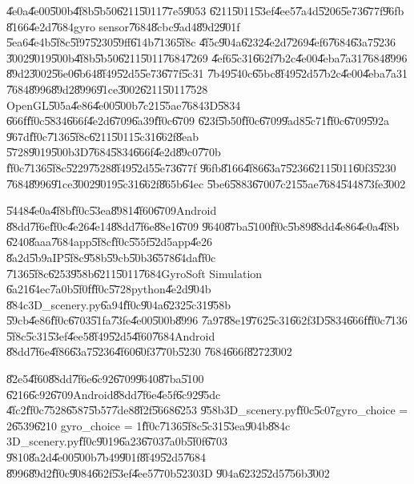 \U{4e0a}\U{4e00}\U{500b}\U{4f8b}\U{5b50}\U{6211}\U{5011}\U{77e5}\U{9053}%
\U{6211}\U{5011}\U{53ef}\U{4ee5}\U{7a4d}\U{5206}\U{5e73}\U{677f}\U{96fb}%
\U{8166}\U{4e2d}\U{7684}gyro sensor\U{7684}\U{8cbc}\U{9ad4}\U{89d2}\U{901f}%
\U{5ea6}\U{4e4b}\U{5f8c}\U{5f97}\U{5230}\U{59ff}\U{614b}\U{7136}\U{5f8c}%
\U{4f5c}\U{904a}\U{6232}\U{4e2d}\U{7269}\U{4ef6}\U{7684}\U{63a7}\U{5236}%
\U{3002}\U{9019}\U{500b}\U{4f8b}\U{5b50}\U{6211}\U{5011}\U{7684}\U{7269}%
\U{4ef6}\U{5c31}\U{662f}\U{7b2c}\U{4e00}\U{4eba}\U{7a31}\U{7684}\U{8996}%
\U{89d2}\U{3002}\U{56e0}\U{6b64}\U{8f49}\U{52d5}\U{5e73}\U{677f}\U{5c31}%
\U{7b49}\U{540c}\U{65bc}\U{8f49}\U{52d5}\U{7b2c}\U{4e00}\U{4eba}\U{7a31}%
\U{7684}\U{8996}\U{89d2}\U{8996}\U{91ce}\U{3002}\U{6211}\U{5011}\U{7528}%
OpenGL\U{505a}\U{4e86}\U{4e00}\U{500b}\U{7c21}\U{55ae}\U{7684}3D\U{5834}%
\U{666f}\U{ff0c}\U{5834}\U{666f}\U{4e2d}\U{6709}\U{6a39}\U{ff0c}\U{6709}%
\U{623f}\U{5b50}\U{ff0c}\U{6709}\U{9ad8}\U{5c71}\U{ff0c}\U{6709}\U{592a}%
\U{967d}\U{ff0c}\U{7136}\U{5f8c}\U{6211}\U{5011}\U{5c31}\U{662f}\U{8eab}%
\U{5728}\U{9019}\U{500b}3D\U{7684}\U{5834}\U{666f}\U{4e2d}\U{89c0}\U{770b}%
\U{ff0c}\U{7136}\U{5f8c}\U{5229}\U{7528}\U{8f49}\U{52d5}\U{5e73}\U{677f}%
\U{96fb}\U{8166}\U{4f86}\U{63a7}\U{5236}\U{6211}\U{5011}\U{60f3}\U{5230}%
\U{7684}\U{8996}\U{91ce}\U{3002}\U{9019}\U{5c31}\U{662f}\U{865b}\U{64ec}%
\U{5be6}\U{5883}\U{6700}\U{7c21}\U{55ae}\U{7684}\U{5448}\U{73fe}\U{3002}

\bigskip

\U{5448}\U{4e0a}\U{4f8b}\U{ff0c}\U{53ea}\U{8981}\U{4f60}\U{6709}Android%
\U{88dd}\U{7f6e}\U{ff0c}\U{4e26}\U{4e14}\U{88dd}\U{7f6e}\U{88e1}\U{6709}%
\U{9640}\U{87ba}\U{5100}\U{ff0c}\U{5b89}\U{88dd}\U{4e86}\U{4e0a}\U{4f8b}%
\U{6240}\U{8aaa}\U{7684}app\U{5f8c}\U{ff0c}\U{555f}\U{52d5}app\U{4e26}%
\U{8a2d}\U{5b9a}IP\U{5f8c}\U{958b}\U{59cb}\U{50b3}\U{6578}\U{64da}\U{ff0c}%
\U{7136}\U{5f8c}\U{6253}\U{958b}\U{6211}\U{5011}\U{7684}GyroSoft Simulation%
\U{6a21}\U{64ec}\U{7a0b}\U{5f0f}\U{ff0c}\U{5728}python\U{4e2d}\U{904b}%
\U{884c}3D\_scenery.py\U{6a94}\U{ff0c}\U{904a}\U{6232}\U{5c31}\U{958b}%
\U{59cb}\U{4e86}\U{ff0c}\U{6703}\U{51fa}\U{73fe}\U{4e00}\U{500b}\U{8996}%
\U{7a97}\U{88e1}\U{9762}\U{5c31}\U{662f}3D\U{5834}\U{666f}\U{ff0c}\U{7136}%
\U{5f8c}\U{5c31}\U{53ef}\U{4ee5}\U{8f49}\U{52d5}\U{4f60}\U{7684}Android%
\U{88dd}\U{7f6e}\U{4f86}\U{63a7}\U{5236}\U{4f60}\U{60f3}\U{770b}\U{5230}%
\U{7684}\U{666f}\U{8272}\U{3002}

\bigskip

\U{82e5}\U{4f60}\U{88dd}\U{7f6e}\U{6c92}\U{6709}\U{9640}\U{87ba}\U{5100}%
\U{6216}\U{6c92}\U{6709}Android\U{88dd}\U{7f6e}\U{4e5f}\U{6c92}\U{95dc}%
\U{4fc2}\U{ff0c}\U{7528}\U{6587}\U{5b57}\U{7de8}\U{8f2f}\U{5668}\U{6253}%
\U{958b}3D\_scenery.py\U{ff0c}\U{5c07}gyro\_choice = 2\U{6539}\U{6210}%
gyro\_choice = 1\U{ff0c}\U{7136}\U{5f8c}\U{5c31}\U{53ea}\U{904b}\U{884c}%
3D\_scenery.py\U{ff0c}\U{9019}\U{6a23}\U{6703}\U{7a0b}\U{5f0f}\U{6703}%
\U{9810}\U{8a2d}\U{4e00}\U{500b}\U{7b49}\U{901f}\U{8f49}\U{52d5}\U{7684}%
\U{8996}\U{89d2}\U{ff0c}\U{9084}\U{662f}\U{53ef}\U{4ee5}\U{770b}\U{5230}3D%
\U{904a}\U{6232}\U{52d5}\U{756b}\U{3002}

